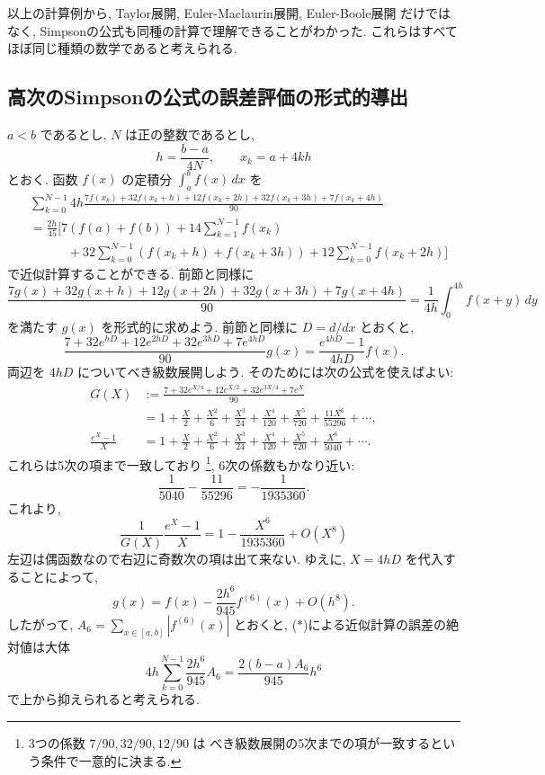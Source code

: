 \documentclass[12pt,twoside]{jarticle}
\theoremstyle{jplain}
\theoremstyle{jplain}
\theoremstyle{jplain}
\numberwithin{theorem}{section}
\numberwithin{equation}{section}
\numberwithin{figure}{section}
\numberwithin{table}{section}
\begin{document}
以上の計算例から, Taylor展開, Euler-Maclaurin展開, Euler-Boole展開
だけではなく, Simpsonの公式も同種の計算で理解できることがわかった.
これらはすべてほぼ同じ種類の数学であると考えられる.


\subsection{高次のSimpsonの公式の誤差評価の形式的導出}
\label{sec:formal-higher-Simpson}

$a<b$ であるとし, $N$ は正の整数であるとし,
\[
  h = \frac{b-a}{4N}, \qquad x_k = a+4kh
\]
とおく. 函数 $f(x)$ の定積分 $\int_a^b f(x)\,dx$ を
\begin{align*}
  &
  \sum_{k=0}^{N-1}4h\frac{7f(x_k)+32f(x_k+h)+12f(x_k+2h)+32f(x_k+3h)+7f(x_k+4h)}{90}
  \\ &
  =\frac{2h}{45}\Biggl[
  7(f(a)+f(b))
  +14\sum_{k=1}^{N-1}f(x_k)
  \\
  &\qquad\quad+32\sum_{k=0}^{N-1}(f(x_k+h)+f(x_k+3h))
  +12\sum_{k=0}^{N-1}f(x_k+2h)
  \Biggr]
  \tag{$*$}
\end{align*}
で近似計算することができる. 前節と同様に
\[
\frac{7g(x)+32g(x+h)+12g(x+2h)+32g(x+3h)+7g(x+4h)}{90}
=\frac{1}{4h}\int_0^{4h}f(x+y)\,dy
\]
を満たす $g(x)$ を形式的に求めよう. 前節と同様に $D=d/dx$ とおくと,
\[
\frac{7+32e^{hD}+12e^{2hD}+32e^{3hD}+7e^{4hD}}{90}g(x)
=\frac{e^{4hD}-1}{4hD}f(x).
\]
両辺を $4hD$ についてべき級数展開しよう.
そのためには次の公式を使えばよい:
\begin{align*}
  G(X)
  &:=\frac{7+32e^{X/4}+12e^{X/2}+32e^{3X/4}+7e^{X}}{90}
  \\
  &= 1 + \frac{X}{2} + \frac{X^{2}}{6} + \frac{X^{3}}{24} + \frac{X^{4}}{120}
  + \frac{X^{5}}{720} + \frac{11 X^{6}}{55296} + \cdots,
  \\
  \frac{e^X-1}{X}
  &= 1 + \frac{X}{2} + \frac{X^{2}}{6} + \frac{X^{3}}{24} + \frac{X^{4}}{120}
  + \frac{X^{5}}{720} + \frac{X^{6}}{5040} + \cdots.
\end{align*}
これらは5次の項まで一致しており%
\footnote{3つの係数 $7/90,32/90,12/90$ は
べき級数展開の5次までの項が一致するという条件で一意的に決まる.},
6次の係数もかなり近い:
\[
  \frac{1}{5040}-\frac{11}{55296} = -\frac{1}{1935360}.
\]
これより,
\[
  \frac{1}{G(X)}\frac{e^X-1}{X}
  = 1 - \frac{X^6}{1935360} + O(X^8)
\]
左辺は偶函数なので右辺に奇数次の項は出て来ない.
ゆえに, $X=4hD$ を代入することによって,
\[
  g(x) = f(x) - \frac{2h^6}{945}f^{(6)}(x) + O(h^8).
\]
したがって, $A_6=\sum_{x\in[a,b]}|f^{(6)}(x)|$ とおくと,
($*$)による近似計算の誤差の絶対値は大体
\[
  4h\sum_{k=0}^{N-1}\frac{2h^6}{945}A_6
  = \frac{2(b-a)A_6}{945}h^6
\]
で上から抑えられると考えられる.
\end{document}
